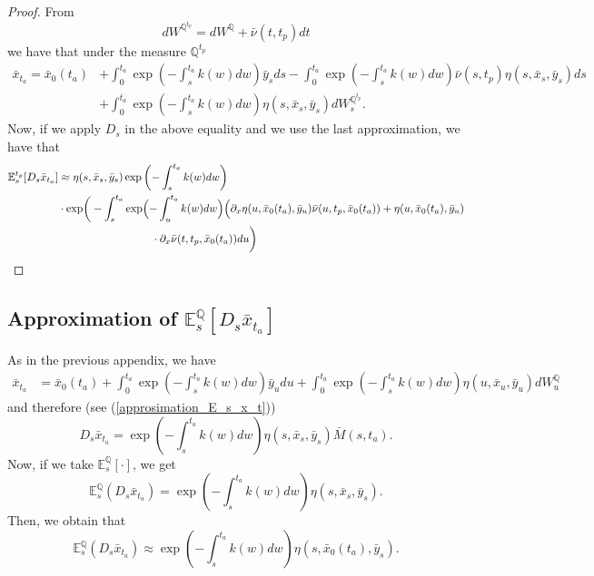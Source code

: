 \documentclass[a4paper,10pt]{article}
\newcommand{\1}{\mathbf{1}}
\begin{document}
\begin{proof}
From 
\begin{equation*}
dW^{\mathbb{Q}^{t_p}} = dW^{\mathbb{Q}} + \bar{\nu}(t,t_p) dt
\end{equation*}
we have that under the measure $\mathbb{Q}^{t_p}$ 
\begin{align*}
\bar{x}_{t_a} = \bar{x}_0(t_a) &+ \int_{0}^{t_a} \exp\left(-\int_{s}^{t_a}k(w) dw\right) \bar{y}_s ds - \int_{0}^{t_a} \exp\left(-\int_{s}^{t_a}k(w) dw\right) \bar{\nu}(s, t_p) \eta(s,\bar{x}_s,\bar{y}_s) ds   \\
&+ \int_{0}^{t_a}  \exp\left(-\int_{s}^{t_a}k(w) dw \right)\eta(s,\bar{x}_s,\bar{y}_s) dW_s^{\mathbb{Q}^{t_p}}. 
\end{align*}
Now, if we apply $D_s$ in the above equality and we use the last approximation, we have that
\begin{align*}
\mathbb{E}^{t_p}_s[D_s \bar{x}_{t_a}] &\approx \eta(s,\bar{x}_s,\bar{y}_s) \exp\left(-\int_{s}^{t_a}k(w) dw \right)\\ &\cdot \exp\biggr(-\int_{s}^{t_a} \exp\Bigl(-\int_{u}^{t_a}k(w) dw\Bigr) \Bigl(\partial_x \eta(u, \bar{x}_0(t_a), \bar{y}_{u}) \bar{\nu}(u,t_p, \bar{x}_0(t_a)) + \eta(u,\bar{x}_0(t_a), \bar{y}_{u}) \\
\qquad &\hspace{3cm} \cdot \partial_x \bar{\nu} (t,t_p, \bar{x}_0(t_a)) du\biggr)
\end{align*}
\end{proof}

\subsection{Approximation of $\mathbb{E}_s^{\mathbb{Q}}\left[D_s \bar{x}_{t_a}\right]$}
As in the previous appendix, we have
\begin{align*}
\bar{x}_{t_a} &= \bar{x}_0(t_a) + \int_{0}^{t_a} \exp\left(-\int_{s}^{t_a}k(w) dw\right) \bar{y}_u du + \int_{0}^{t_a} \exp\left(-\int_{s}^{t_a}k(w) dw \right) \eta(u,\bar{x}_u,\bar{y}_u) dW_u^{\mathbb{Q}}
\end{align*}
and therefore (see (\ref{approsimation_E_s_x_t}))
\begin{equation}
D_s \bar{x}_{t_a} =  \exp\left(-\int_{s}^{t_a}k(w) dw \right) \eta(s,\bar{x}_s,\bar{y}_{s})\bar{M}(s,t_a).
\end{equation}
Now, if we take $\mathbb{E}_s^{\mathbb{Q}}\left[\cdot\right]$, we get
\begin{equation}\label{approximation_spot_E_s_x_t}
\mathbb{E}^{\mathbb{Q}}_s\left(D_s \bar{x}_{t_a} \right)=\exp\left(-\int_{s}^{t_a}k(w) dw \right) \eta(s,\bar{x}_s,\bar{y}_{s}).
\end{equation}
Then, we obtain that
\begin{equation}\label{approximation_spot_E_s_x_t}
\mathbb{E}^{\mathbb{Q}}_s\left(D_s \bar{x}_{t_a} \right) \approx \exp\left(-\int_{s}^{t_a}k(w) dw \right) \eta(s,\bar{x}_0(t_a),\bar{y}_{s}).
\end{equation}
\end{document}

